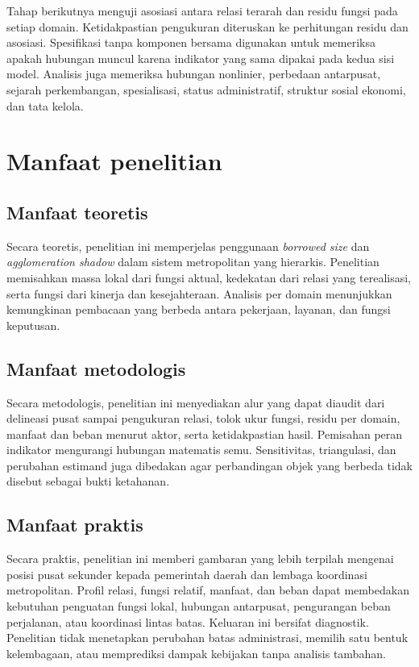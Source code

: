 \documentclass[11pt,a4paper,oneside,openany,indonesian]{report}
\begin{document}
Tahap berikutnya menguji asosiasi antara relasi terarah dan residu fungsi pada setiap domain. Ketidakpastian pengukuran diteruskan ke perhitungan residu dan asosiasi. Spesifikasi tanpa komponen bersama digunakan untuk memeriksa apakah hubungan muncul karena indikator yang sama dipakai pada kedua sisi model. Analisis juga memeriksa hubungan nonlinier, perbedaan antarpusat, sejarah perkembangan, spesialisasi, status administratif, struktur sosial ekonomi, dan tata kelola.

\section{Manfaat penelitian}

\subsection{Manfaat teoretis}

Secara teoretis, penelitian ini memperjelas penggunaan \emph{borrowed size} dan \emph{agglomeration shadow} dalam sistem metropolitan yang hierarkis. Penelitian memisahkan massa lokal dari fungsi aktual, kedekatan dari relasi yang terealisasi, serta fungsi dari kinerja dan kesejahteraan. Analisis per domain menunjukkan kemungkinan pembacaan yang berbeda antara pekerjaan, layanan, dan fungsi keputusan.

\subsection{Manfaat metodologis}

Secara metodologis, penelitian ini menyediakan alur yang dapat diaudit dari delineasi pusat sampai pengukuran relasi, tolok ukur fungsi, residu per domain, manfaat dan beban menurut aktor, serta ketidakpastian hasil. Pemisahan peran indikator mengurangi hubungan matematis semu. Sensitivitas, triangulasi, dan perubahan estimand juga dibedakan agar perbandingan objek yang berbeda tidak disebut sebagai bukti ketahanan.

\subsection{Manfaat praktis}

Secara praktis, penelitian ini memberi gambaran yang lebih terpilah mengenai posisi pusat sekunder kepada pemerintah daerah dan lembaga koordinasi metropolitan. Profil relasi, fungsi relatif, manfaat, dan beban dapat membedakan kebutuhan penguatan fungsi lokal, hubungan antarpusat, pengurangan beban perjalanan, atau koordinasi lintas batas. Keluaran ini bersifat diagnostik. Penelitian tidak menetapkan perubahan batas administrasi, memilih satu bentuk kelembagaan, atau memprediksi dampak kebijakan tanpa analisis tambahan.
\end{document}
